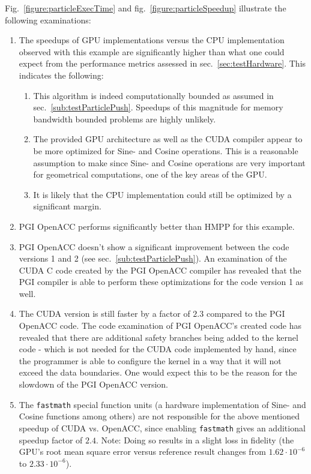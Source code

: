 Fig.~\ref{figure:particleExecTime} and fig.~\ref{figure:particleSpeedup} illustrate the following examinations: 

\begin{enumerate}
 \item The speedups of GPU implementations versus the CPU implementation observed with this example are significantly higher than what one could expect from the performance metrics assessed in sec.~\ref{sec:testHardware}. This indicates the following: 
 \begin{enumerate}
  \item This algorithm is indeed computationally bounded as assumed in sec.~\ref{sub:testParticlePush}. Speedups of this magnitude for memory bandwidth bounded problems are highly unlikely. 
  \item The provided GPU architecture as well as the CUDA compiler appear to be more optimized for Sine- and Cosine operations. This is a reasonable assumption to make since Sine- and Cosine operations are very important for geometrical computations, one of the key areas of the GPU. 
  \item It is likely that the CPU implementation could still be optimized by a significant margin.
 \end{enumerate}
 \item PGI OpenACC performs significantly better than HMPP for this example.
 \item PGI OpenACC doesn't show a significant improvement between the code versions 1 and 2 (see sec.~\ref{sub:testParticlePush}). An examination of the CUDA C code created by the PGI OpenACC compiler has revealed that the PGI compiler is able to perform these optimizations for the code version 1 as well.
 \item The CUDA version is still faster by a factor of $2.3$ compared to the PGI OpenACC code. The code examination of PGI OpenACC's created code has revealed that there are additional safety branches being added to the kernel code - which is not needed for the CUDA code implemented by hand, since the programmer is able to configure the kernel in a way that it will not exceed the data boundaries. One would expect this to be the reason for the slowdown of the PGI OpenACC version. 
 \item The \verb|fastmath| special function units (a hardware implementation of Sine- and Cosine functions among others) are not responsible for the above mentioned speedup of CUDA vs. OpenACC, since enabling \verb|fastmath| gives an additional speedup factor of $2.4$. Note: Doing so results in a slight loss in fidelity (the GPU's root mean square error versus reference result changes from $1.62 \cdot 10^{-6}$ to $2.33 \cdot 10^{-6}$).
\end{enumerate}

